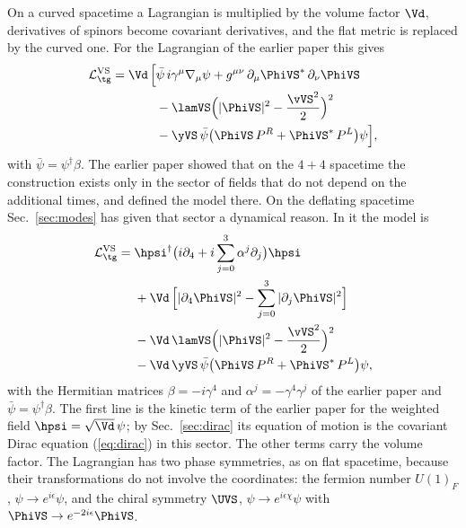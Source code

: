 On a curved spacetime a Lagrangian is multiplied by the volume factor $\Vd$, derivatives of spinors
become covariant derivatives, and the flat metric is replaced by the curved one.
For the Lagrangian of the earlier paper this gives
\begin{align}
\mathcal L_{\tg}^{\mathrm{VS}}=\Vd\,\Big[&\bar\psi\,i\gamma^{\mu}\nabla_\mu\psi
+g^{\mu\nu}\,\partial_\mu\PhiVS^{*}\,\partial_\nu\PhiVS\nonumber\\
&-\lamVS\Big(|\PhiVS|^{2}-\frac{\vVS^{2}}{2}\Big)^{2}\nonumber\\
&-\yVS\,\bar\psi\big(\PhiVS\,P^{R}+\PhiVS^{*}\,P^{L}\big)\psi\Big],
\label{eq:LVS}
\end{align}
with $\bar\psi=\psi^\dagger\beta$.
The earlier paper showed that on the $4+4$ spacetime the construction exists only in the sector of
fields that do not depend on the additional times, and defined the model there. On the deflating
spacetime Sec.~\ref{sec:modes} has given that sector a dynamical reason. In it the model is
\begin{align}
\mathcal L_{\tg}^{\mathrm{VS}}={}&\hpsi^\dagger\big(i\partial_4+i\sum_{j=0}^{3}\alpha^{j}\partial_j\big)\hpsi\nonumber\\
&+\Vd\,\Big[|\partial_4\PhiVS|^{2}-\sum_{j=0}^{3}|\partial_j\PhiVS|^{2}\Big]\nonumber\\
&-\Vd\,\lamVS\Big(|\PhiVS|^{2}-\frac{\vVS^{2}}{2}\Big)^{2}\nonumber\\
&-\Vd\,\yVS\,\bar\psi\big(\PhiVS\,P^{R}+\PhiVS^{*}\,P^{L}\big)\psi ,
\label{eq:LVS}
\end{align}
with the Hermitian matrices $\beta=-i\gamma^{4}$ and $\alpha^{j}=-\gamma^{4}\gamma^{j}$ of the earlier
paper and $\bar\psi=\psi^\dagger\beta$. The first line is the kinetic term of the earlier paper for
the weighted field $\hpsi=\sqrt{\Vd}\,\psi$; by Sec.~\ref{sec:dirac} its equation of motion is the
covariant Dirac equation (\ref{eq:dirac}) in this sector. The other terms carry the volume factor.
The Lagrangian has two phase symmetries, as on flat spacetime, because their transformations do not
involve the coordinates: the fermion number $U(1)_F$, $\psi\to e^{i\epsilon}\psi$, and the chiral
symmetry $\UVS$, $\psi\to e^{i\epsilon\chi}\psi$ with $\PhiVS\to e^{-2i\epsilon}\PhiVS$.

